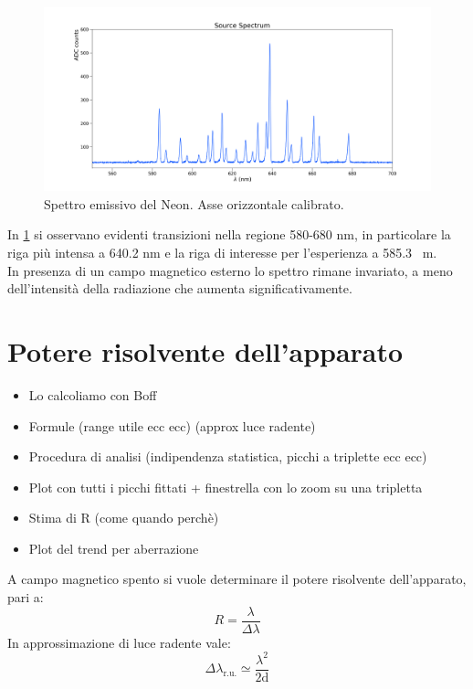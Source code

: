 \documentclass[twocolumn,10pt]{asme2ej}
\begin{document}
\begin{figure}
    \centering
    \includegraphics[width=\textwidth]{../Spectrum/SpectrumPlots/spettro1d_Boff.png}
    \caption{Spettro emissivo del Neon. Asse orizzontale calibrato.}
    \label{i:spettro1d}
\end{figure}

In \figurename\ref{i:spettro1d} si osservano evidenti transizioni nella regione 580-680 \si{\nano \metre}, in
particolare la riga più intensa a 640.2 \si{\nano \metre} e la riga di interesse per l'esperienza a 585.3 \si{\nano
\metre}.\\
In presenza di un campo magnetico esterno lo spettro rimane invariato, a meno dell'intensità della radiazione che
aumenta significativamente. 




\section{Potere risolvente dell'apparato}

\begin{itemize}
    \item Lo calcoliamo con Boff
    \item Formule (range utile ecc ecc) (approx luce radente) 
    \item Procedura di analisi (indipendenza statistica, picchi a triplette ecc ecc)
    \item Plot con tutti i picchi fittati + finestrella con lo zoom su una tripletta
    \item Stima di R (come quando perchè)
    \item Plot del trend per aberrazione 
\end{itemize}
A campo magnetico spento si vuole determinare il potere risolvente dell'apparato, pari a:
\begin{equation}
    R = \frac{\lambda}{\Delta \lambda}
\end{equation}
In approssimazione di luce radente vale:
\begin{equation}
    \Delta \lambda_{\text{r.u.}} \simeq \frac{\lambda^2}{2\text{d}}
    \label{e:lambdaru}
\end{equation}
\end{document}
